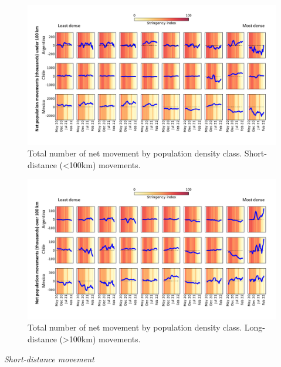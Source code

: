 \documentclass[
  11pt,
]{article}
\begin{document}
\begin{figure}

{\centering \includegraphics{../outputs/netflows_u100_0km_format_report_minus_Colombia.pdf}

}

\caption{\label{fig-fig4}Total number of net movement by population
density class. Short-distance (\textless100km) movements.}

\end{figure}

\begin{figure}

{\centering \includegraphics{../outputs/netflows_o100_0km_format_report_minus_Colombia.pdf}

}

\caption{\label{fig-fig5}Total number of net movement by population
density class. Long-distance (\textgreater100km) movements.}

\end{figure}

\emph{Short-distance movement}
\end{document}
